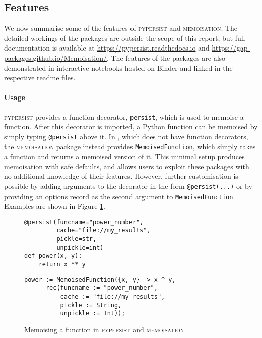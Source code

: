 \documentclass{deliverablereport}
\newcommand{\pypersist}{\textsc{pypersist}}
\newcommand{\Memoisation}{\textsc{memoisation}}
\begin{document}
\subsection{Features}
\label{sec:features}

We now summarise some of the features of \pypersist{} and \Memoisation{}.  The
detailed workings of the packages are outside the scope of this report, but full
documentation is available at \url{https://pypersist.readthedocs.io} and
\url{https://gap-packages.github.io/Memoisation/}.  The features of the packages
are also demonstrated in interactive notebooks hosted on Binder and linked in
the respective readme files.

\paragraph{Usage}
\pypersist{} provides a function decorator, \texttt{persist}, which is used to
memoise a function.  After this decorator is imported, a Python function can be
memoised by simply typing \texttt{@persist} above it.  In \GAP, which does not
have function decorators, the \Memoisation{} package instead provides
\texttt{MemoisedFunction}, which simply takes a function and returns a memoised
version of it.  This minimal setup produces memoisation with safe defaults, and
allows users to exploit these packages with no additional knowledge of their
features.  However, further customisation is possible by adding arguments to the
decorator in the form \texttt{@persist(...)} or by providing an options record
as the second argument to \texttt{MemoisedFunction}.  Examples are shown in
Figure \ref{fig:how-to-call}.

\begin{figure}[h]
  \centering
  \begin{minipage}[t]{.45\textwidth}
    {\tiny
    \begin{verbatim}
@persist(funcname="power_number",
         cache="file://my_results",
         pickle=str,
         unpickle=int)
def power(x, y):
    return x ** y
    \end{verbatim}
    }
  \end{minipage}
  \quad
  \begin{minipage}[t]{.45\textwidth}
    {\tiny
    \begin{verbatim}
power := MemoisedFunction({x, y} -> x ^ y,
      rec(funcname := "power_number",
          cache := "file://my_results",
          pickle := String,
          unpickle := Int));
    \end{verbatim}
    }
  \end{minipage}
  \caption{Memoising a function in \pypersist{} and \Memoisation{}}
  \label{fig:how-to-call}
\end{figure}
\end{document}

